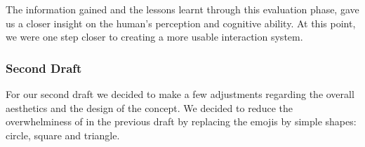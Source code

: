 The information gained and the lessons learnt through this evaluation phase, gave us a closer insight on the human's perception and cognitive ability. At this point, we were one step closer to creating a more usable interaction system. 

\subsubsection{Second Draft}
For our second draft we decided to make a few adjustments regarding the overall aesthetics and the design of the concept. We decided to reduce the overwhelminess of in the previous draft by replacing the emojis by simple shapes: circle, square and triangle. 

